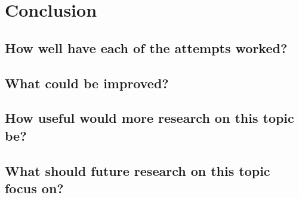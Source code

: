 
\chapter{Conclusion}

\section{How well have each of the attempts worked?}

\section{What could be improved?}

\section{How useful would more research on this topic be?}

\section{What should future research on this topic focus on?}
